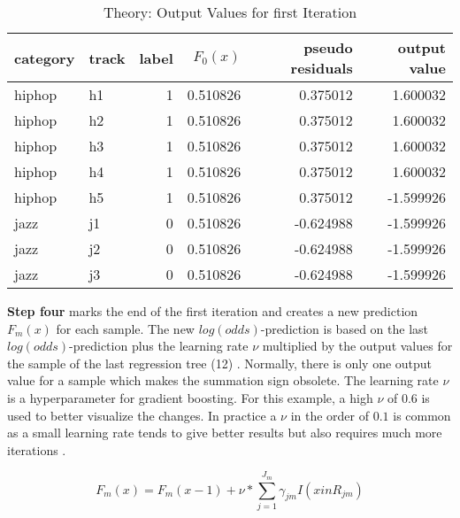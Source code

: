 \begin{table}[H]
    \centering
    \begin{tabular}{llrrrr}
        \toprule
        category & track &  label &  \(F_{0}(x)\) &  pseudo residuals &  output value \\
        \midrule
          hiphop &    h1 &      1 & 0.510826 &            0.375012 &        1.600032 \\
          hiphop &    h2 &      1 & 0.510826 &            0.375012 &        1.600032 \\
          hiphop &    h3 &      1 & 0.510826 &            0.375012 &        1.600032 \\
          hiphop &    h4 &      1 & 0.510826 &            0.375012 &        1.600032 \\
          hiphop &    h5 &      1 & 0.510826 &            0.375012 &       -1.599926 \\
            jazz &    j1 &      0 & 0.510826 &           -0.624988 &       -1.599926 \\
            jazz &    j2 &      0 & 0.510826 &           -0.624988 &       -1.599926 \\
            jazz &    j3 &      0 & 0.510826 &           -0.624988 &       -1.599926 \\
        \bottomrule
        \end{tabular}
    \caption{Theory: Output Values for first Iteration}%
    \label{tbl:theory_output_values_1_iteration}%
  \end{table} 

\textbf{Step four} marks the end of the first iteration and creates a new prediction \(F_{m}(x)\) for each sample. 
The new \(log(odds)\)-prediction is based on the last \(log(odds)\)-prediction plus the learning rate \(\nu\) multiplied by 
the output values for the sample of the last regression tree (12) \cite[p.1203]{Friedman_2001}. Normally, there is only one 
output value for a sample which makes the summation sign obsolete. The learning rate \(\nu\) is a 
hyperparameter for gradient boosting. For this example, a high \(\nu\) of \(0.6\) is used to better visualize 
the changes. In practice a \(\nu \) in the order of \(0.1\) is common as a small learning rate tends to
give better results but also requires much more iterations \cite[p.1206]{Friedman_2001}. 

\begin{equation}
F_{m}(x) = F_{m}(x- 1) + \nu * \sum_{j = 1}^{J_{m}} \gamma_{jm}I(x in R_{jm})
\end{equation}

